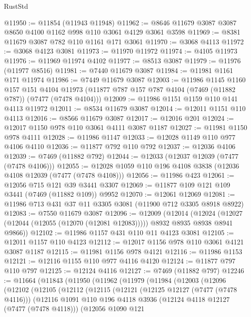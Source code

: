 \begin{lexlean}{RustStd}
\begin{coremodule}
@11950 := @11854 (@11943 @11948)
@11962 := @8646 @11679 @3087 @3087 @8650 @4100 @1162 @998 @110 @3061 @4129 @3061 @3598
@11969 := @8381 @11679 @3087 @782 @110 @1161 @171 @3061
@11970 := @3068 @4113
@11972 := @3068 @4123 @3081
@11973 := @11970 @11972
@11974 := @4105 @11973
@11976 := @11969 @11974 @4102
@11977 := @8513 @3087
@11979 := @11976 (@11977 @8516)
@11981 := @7440 @11679 @3087
@11984 := @11981 @1161 @171 @11974
@11986 := @7449 @11679 @3087
@12003 := @11986
    @1145
    @1160
    @157
    @151
    @4104
    @11973
    (@11877 @787 @157 @787 @4104 (@7469 (@11882 @787)) (@7477 (@7478 @4104)))
@12009 := @11986 @1151 @1159 @110 @141 @4113 @11972
@12011 := @8534 @11679 @3087
@12014 := @12011 @1151 @110 @4113
@12016 := @8566 @11679 @3087
@12017 := @12016 @201
@12024 := @12017 @1150 @978 @110 @3061 @4111 @3087 @1187
@12027 := @11981 @1150 @978 @4111
@12028 := @11986 @1147
@12033 := @12028 @1149 @110 @977 @4106 @4110
@12036 := @11877 @792 @110 @792
@12037 := @12036 @4106
@12039 := @7469 (@11882 @792)
@12044 := @12033 (@12037 @12039 (@7477 (@7478 @4106)))
@12055 := @12028 @1059 @110 @196 @4108 @3838 (@12036 @4108 @12039 (@7477 (@7478 @4108)))
@12056 := @11986 @423
@12061 := @12056 @715 @121 @39 @3441 @3307
@12069 := @11877 @109 @121 @109 @3441 (@7469 (@11882 @109)) @9952
@12070 := @12061 @12069
@12081 := @11986 @713 @431 @37 @11 @3305 @3081 (@11900 @712 @3305 @8918 @8922)
@12083 := @7550 @11679 @3087
@12096 := @12009
    (@12014
      (@12024 (@12027 (@12044 (@12055 (@12070 (@12081 @12083))))) @8932 @8935 @8938 @8941 @9866))
@12102 := @11986 @1157 @431 @110 @11 @4123 @3081
@12105 := @12011 @1157 @110 @4123
@12112 := @12017 @1156 @978 @110 @3061 @4121 @3087 @1187
@12115 := @11981 @1156 @978 @4121
@12116 := @11986 @1153
@12121 := @12116 @1155 @110 @977 @4116 @4120
@12124 := @11877 @797 @110 @797
@12125 := @12124 @4116
@12127 := @7469 (@11882 @797)
@12246 := @11664
    (@11843
      (@11950
        (@11962
          (@11979
            (@11984
              (@12003
                (@12096
                  (@12102
                    (@12105
                      (@12112
                        (@12115
                          (@12121
                            (@12125 @12127 (@7477 (@7478 @4116)))
                            (@12116
                              @1091
                              @110
                              @196
                              @4118
                              @3936
                              (@12124 @4118 @12127 (@7477 (@7478 @4118)))
                              (@12056
                                @1090
                                @121

\end{coremodule}
\end{lexlean}
